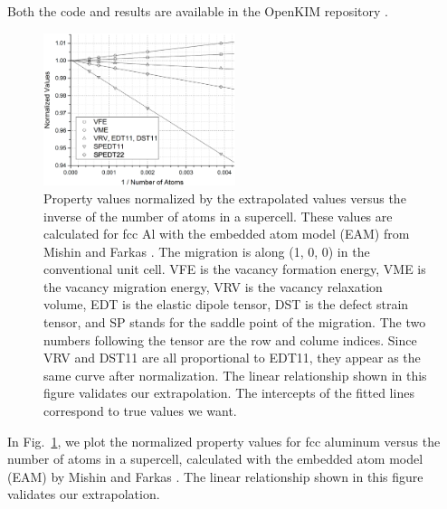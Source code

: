 \documentclass[%
 reprint,
 amsmath,amssymb,
 aps,
]{revtex4-1}
\begin{document}
Both the code and results are available in the OpenKIM repository \cite{openkim2016}.

\begin{figure}
\includegraphics[width=0.5\textwidth]{extrapolation}%
\caption{\label{fig:extrapolation}
Property values normalized by the extrapolated values versus the inverse of the number of atoms in a supercell.
These values are calculated for fcc Al with the embedded atom model (EAM) from Mishin and Farkas \cite{mishin1999interatomic}.
The migration is along (1, 0, 0) in the conventional unit cell.
VFE is the vacancy formation energy, VME is the vacancy migration energy, VRV is the vacancy relaxation volume, EDT is the elastic dipole tensor, DST is the defect strain tensor, and SP stands for the saddle point of the migration.
The two numbers following the tensor are the row and colume indices.
Since VRV and DST11 are all proportional to EDT11, they appear as the same curve after normalization.
The linear relationship shown in this figure validates our extrapolation.
The intercepts of the fitted lines correspond to true values we want.
}
\end{figure}

In Fig.~\ref{fig:extrapolation}, we plot the normalized property values for fcc aluminum versus the number of atoms in a supercell, calculated with the embedded atom model (EAM) by Mishin and Farkas \cite{mishin1999interatomic}.
The linear relationship shown in this figure validates our extrapolation.

\end{document}
